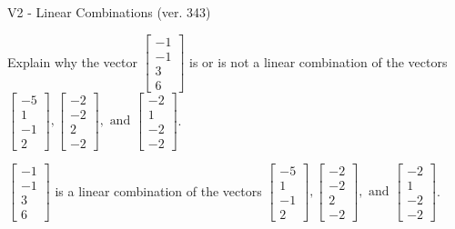 \begin{exercise}
  \begin{exerciseTitle}V2 - Linear Combinations (ver. 343)\end{exerciseTitle}
  \begin{exerciseStatement}
    Explain why the vector \(\left[\begin{array}{c}
-1 \\
-1 \\
3 \\
6
\end{array}\right]\)  is or is not a linear 
	combination of the vectors \(\left[\begin{array}{c}
-5 \\
1 \\
-1 \\
2
\end{array}\right] , \left[\begin{array}{c}
-2 \\
-2 \\
2 \\
-2
\end{array}\right] , \text{ and } \left[\begin{array}{c}
-2 \\
1 \\
-2 \\
-2
\end{array}\right]\).
	


  \end{exerciseStatement}
  \begin{exerciseAnswer}
   \(\left[\begin{array}{c}
-1 \\
-1 \\
3 \\
6
\end{array}\right]\) 
  	 is  
	a linear combination of the vectors \(\left[\begin{array}{c}
-5 \\
1 \\
-1 \\
2
\end{array}\right] , \left[\begin{array}{c}
-2 \\
-2 \\
2 \\
-2
\end{array}\right] , \text{ and } \left[\begin{array}{c}
-2 \\
1 \\
-2 \\
-2
\end{array}\right]\).

	
  


  \end{exerciseAnswer}
\end{exercise}